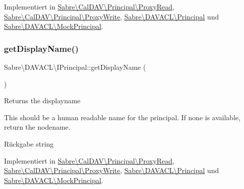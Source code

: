 Implementiert in \mbox{\hyperlink{class_sabre_1_1_cal_d_a_v_1_1_principal_1_1_proxy_read_a110ccaf5f2e2a9c366280f9d7627ff7f}{Sabre\textbackslash{}\+Cal\+D\+A\+V\textbackslash{}\+Principal\textbackslash{}\+Proxy\+Read}}, \mbox{\hyperlink{class_sabre_1_1_cal_d_a_v_1_1_principal_1_1_proxy_write_ab33f269f2f62eb69c6f6b45f50d2e6f3}{Sabre\textbackslash{}\+Cal\+D\+A\+V\textbackslash{}\+Principal\textbackslash{}\+Proxy\+Write}}, \mbox{\hyperlink{class_sabre_1_1_d_a_v_a_c_l_1_1_principal_ad12886b35e394e367e9d2b1d0b854e44}{Sabre\textbackslash{}\+D\+A\+V\+A\+C\+L\textbackslash{}\+Principal}} und \mbox{\hyperlink{class_sabre_1_1_d_a_v_a_c_l_1_1_mock_principal_ac08570a6235b4455752d68a245b654b0}{Sabre\textbackslash{}\+D\+A\+V\+A\+C\+L\textbackslash{}\+Mock\+Principal}}.

\mbox{\label{interface_sabre_1_1_d_a_v_a_c_l_1_1_i_principal_aff7f7f00c81458d5d9e20e28f4d32461}} 
\subsubsection{\texorpdfstring{get\+Display\+Name()}{getDisplayName()}}
{\footnotesize\ttfamily Sabre\textbackslash{}\+D\+A\+V\+A\+C\+L\textbackslash{}\+I\+Principal\+::get\+Display\+Name (\begin{DoxyParamCaption}{ }\end{DoxyParamCaption})}

Returns the displayname

This should be a human readable name for the principal. If none is available, return the nodename.

\begin{DoxyReturn}{Rückgabe}
string 
\end{DoxyReturn}


Implementiert in \mbox{\hyperlink{class_sabre_1_1_cal_d_a_v_1_1_principal_1_1_proxy_read_a1ffd1507b94784b82a2289a677d40eb0}{Sabre\textbackslash{}\+Cal\+D\+A\+V\textbackslash{}\+Principal\textbackslash{}\+Proxy\+Read}}, \mbox{\hyperlink{class_sabre_1_1_cal_d_a_v_1_1_principal_1_1_proxy_write_ad5391ef6b5b3c78020e7f0db2862647d}{Sabre\textbackslash{}\+Cal\+D\+A\+V\textbackslash{}\+Principal\textbackslash{}\+Proxy\+Write}}, \mbox{\hyperlink{class_sabre_1_1_d_a_v_a_c_l_1_1_principal_ab24782e70a36d78a17cac1f33063d656}{Sabre\textbackslash{}\+D\+A\+V\+A\+C\+L\textbackslash{}\+Principal}} und \mbox{\hyperlink{class_sabre_1_1_d_a_v_a_c_l_1_1_mock_principal_ade06f3efdbb9f386b823cbd861c68416}{Sabre\textbackslash{}\+D\+A\+V\+A\+C\+L\textbackslash{}\+Mock\+Principal}}.

